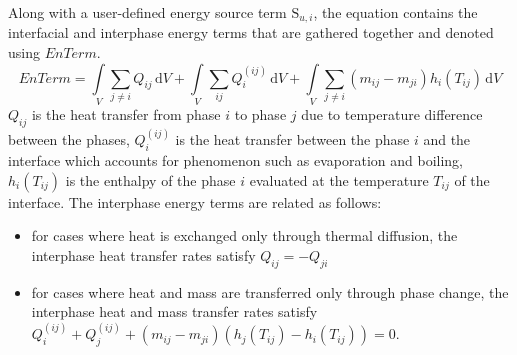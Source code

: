  Along with a user-defined energy source term $\mathrm{S}_{u,i}$,
 the equation contains the interfacial and interphase energy terms that are gathered together
 and denoted using $EnTerm$.
 \begin{equation}
    EnTerm = \int\limits_{V} \sum_{j \neq i} Q_{ij}\,\mathrm{d}V +
 \int\limits_{V} \sum_{ij} Q_{i}^{(ij)}\,\mathrm{d}V 
 + \int\limits_{V} \sum_{j \neq i} (m_{ij} - m_{ji})h_{i}(T_{ij})\,\mathrm{d}V
 \end{equation}
$Q_{ij}$ is the heat transfer from phase $i$ to phase $j$ due to temperature difference between the phases,
$Q_{i}^{(ij)}$ is the heat transfer between the phase $i$ and the interface which accounts for phenomenon
such as evaporation and boiling,
$h_{i}(T_{ij})$ is the enthalpy of the phase $i$ evaluated at the temperature $T_{ij}$ of the interface.
The interphase energy terms are related as follows:
\begin{itemize}
\item for cases where heat is exchanged only through thermal diffusion, the interphase heat transfer rates satisfy $Q_{ij} = -Q_{ji}$
\item for cases where heat and mass are transferred only through phase change, the interphase heat and mass transfer rates satisfy
$Q_{i}^{(ij)} + Q_{j}^{(ij)} + \left(m_{ij} - m_{ji}\right)\left(h_{j}(T_{ij}) - h_{i}(T_{ij})\right) = 0$.
\end{itemize}


